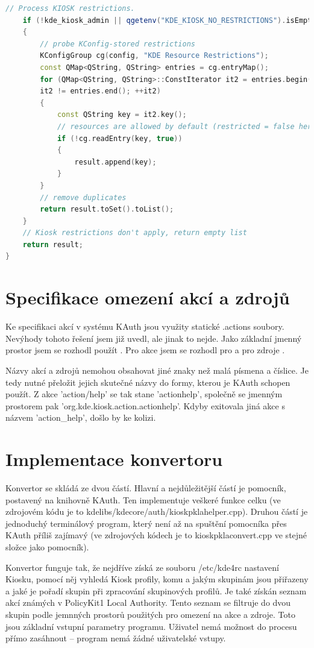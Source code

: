 {\begin{mylisting}
\begin{lstlisting}[language=C++]
    // Process KIOSK restrictions.
    if (!kde_kiosk_admin || qgetenv("KDE_KIOSK_NO_RESTRICTIONS").isEmpty())
    {
        // probe KConfig-stored restrictions
        KConfigGroup cg(config, "KDE Resource Restrictions");
        const QMap<QString, QString> entries = cg.entryMap();
        for (QMap<QString, QString>::ConstIterator it2 = entries.begin();
        it2 != entries.end(); ++it2)
        {
            const QString key = it2.key();
            // resources are allowed by default (restricted = false here)
            if (!cg.readEntry(key, true))
            {
                result.append(key);
            }
        }
        // remove duplicates
        return result.toSet().toList();
    }
    // Kiosk restrictions don't apply, return empty list
    return result;
}
\end{lstlisting}
\end{mylisting}

\section{Specifikace omezení akcí a zdrojů}
Ke specifikaci akcí v systému KAuth jsou využity statické .actions soubory. Nevýhody tohoto řešení jsem již uvedl, ale jinak to nejde. Jako základní jmenný prostor jsem se rozhodl použít . Pro akce jsem se rozhodl pro  a pro zdroje .

Názvy akcí a zdrojů nemohou obsahovat jiné znaky než malá písmena a číslice. Je
tedy nutné přeložit jejich skutečné názvy do formy, kterou je KAuth schopen
použít. Z akce 'action/help' se tak stane 'actionhelp', společně se jmenným
prostorem pak 'org.kde.kiosk.action.actionhelp'. Kdyby exitovala jiná akce
s názvem  'action\_help', došlo by ke kolizi.

\section{Implementace konvertoru}
Konvertor se skládá ze dvou částí. Hlavní a nejdůležitější částí je pomocník, postavený na knihovně KAuth. Ten implementuje veškeré funkce celku (ve zdrojovém kódu je to kdelibs/kdecore/auth/kioskpklahelper.cpp). Druhou částí je jednoduchý terminálový program, který není až na spuštění pomocníka přes KAuth příliš zajímavý (ve zdrojových kódech je to kioskpklaconvert.cpp ve stejné složce jako pomocník).

Konvertor funguje tak, že nejdříve získá ze souboru /etc/kde4rc nastavení Kiosku, pomocí něj vyhledá Kiosk profily, komu a jakým skupinám jsou přiřazeny a jaké je pořadí skupin při zpracování skupinových profilů. Je také získán seznam akcí známých v PolicyKit1 Local Authority. Tento seznam se filtruje do dvou skupin podle jemnných prostorů použitých pro omezení na akce a zdroje. Toto jsou základní vstupní parametry programu. Uživatel nemá možnost do procesu přímo zasáhnout -- program nemá žádné uživatelské vstupy.

}
